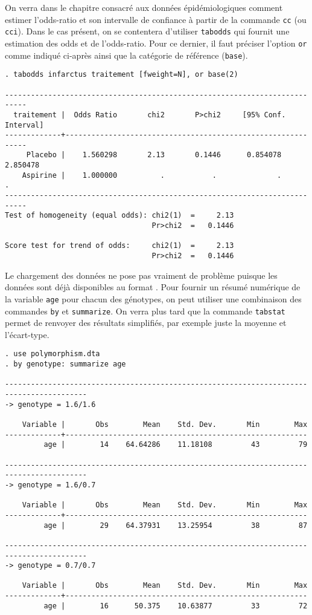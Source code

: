On verra dans le chapitre consacré aux données épidémiologiques comment
estimer l'odds-ratio et son intervalle de confiance à partir de la commande
\texttt{cc} (ou \texttt{cci}). Dans le cas présent, on se contentera
d'utiliser \texttt{tabodds} qui fournit une estimation des odds et de
l'odds-ratio. Pour ce dernier, il faut préciser l'option \texttt{or} comme
indiqué ci-après ainsi que la catégorie de référence (\texttt{base}).
\begin{verbatim}
. tabodds infarctus traitement [fweight=N], or base(2)

---------------------------------------------------------------------------
  traitement |  Odds Ratio       chi2       P>chi2     [95% Conf. Interval]
-------------+-------------------------------------------------------------
     Placebo |    1.560298       2.13       0.1446      0.854078   2.850478
    Aspirine |    1.000000          .           .              .          .
---------------------------------------------------------------------------
Test of homogeneity (equal odds): chi2(1)  =     2.13
                                  Pr>chi2  =   0.1446

Score test for trend of odds:     chi2(1)  =     2.13
                                  Pr>chi2  =   0.1446
\end{verbatim}
%
%
%
\soln{\ref{exo:9.5}} Le chargement des données ne pose pas vraiment de
problème puisque les données sont déjà disponibles au format \Stata. Pour
fournir un résumé numérique de la variable \texttt{age} pour chacun des
génotypes, on peut utiliser une combinaison des commandes \verb|by| et
\verb|summarize|. On verra plus tard que la commande \verb|tabstat| permet
de renvoyer des résultats simplifiés, par exemple juste la moyenne et
l'écart-type. 
\begin{verbatim}
. use polymorphism.dta
. by genotype: summarize age

-----------------------------------------------------------------------------------------
-> genotype = 1.6/1.6

    Variable |       Obs        Mean    Std. Dev.       Min        Max
-------------+--------------------------------------------------------
         age |        14    64.64286    11.18108         43         79

-----------------------------------------------------------------------------------------
-> genotype = 1.6/0.7

    Variable |       Obs        Mean    Std. Dev.       Min        Max
-------------+--------------------------------------------------------
         age |        29    64.37931    13.25954         38         87

-----------------------------------------------------------------------------------------
-> genotype = 0.7/0.7

    Variable |       Obs        Mean    Std. Dev.       Min        Max
-------------+--------------------------------------------------------
         age |        16      50.375    10.63877         33         72
\end{verbatim}
